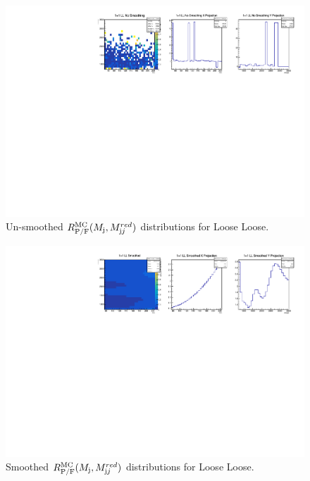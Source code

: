 \begin{figure}[!htb]
	\centering
	\includegraphics[width=1\textwidth]{Figures/LL_nosmoothing.pdf}
	\caption{Un-smoothed $R^\mathrm{MC}_\mathrm{P/F}(M_{\textrm j},M_{\textrm jj}^{red})$ distributions for Loose Loose.}
	\label{fig:qcdunsmoothingLL}
\end{figure}
\begin{figure}[!htb]
	\centering
	\includegraphics[width=1\textwidth]{Figures/LL_smoothed.pdf}
	\caption{Smoothed $R^\mathrm{MC}_\mathrm{P/F}(M_{\textrm j},M_{\textrm jj}^{red})$ distributions for Loose Loose.}
	\label{fig:qcdsmoothingLL}
\end{figure}
